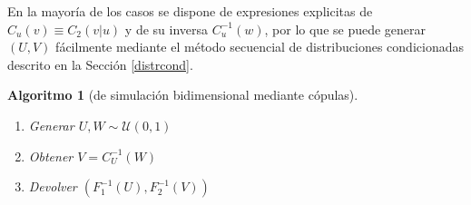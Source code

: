 \documentclass[
  10pt,
]{book}
\theoremstyle{break}
\newtheorem{conjecture}{Algoritmo}[chapter]
\theoremstyle{nonumberplain}
\begin{document}
En la mayoría de los casos se dispone de expresiones explicitas de \(C_{u}(v)\equiv C_2\left( \left. v\right \vert u\right)\) y de su inversa \(C_{u}^{-1}(w)\), por lo que se puede generar \((U,V)\) fácilmente mediante el método secuencial de distribuciones condicionadas descrito en la Sección \ref{distrcond}.

\begin{conjecture}[de simulación bidimensional mediante cópulas]
\protect\hypertarget{cnj:copula-bidim}{}\label{cnj:copula-bidim}

\begin{enumerate}
\def\labelenumi{\arabic{enumi}.}
\item
  Generar \(U,W\sim \mathcal{U}(0,1)\)
\item
  Obtener \(V=C_{U}^{-1}(W)\)
\item
  Devolver \(\left( F_1^{-1}(U),F_2^{-1}(V)\right)\)
\end{enumerate}

\end{conjecture}
\end{document}
